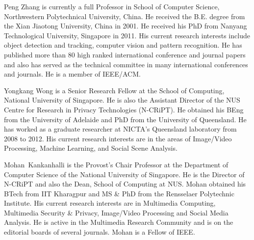 \documentclass[journal]{IEEEtran}
\begin{document}
\begin{IEEEbiography}{Peng Zhang}
	is currently a full Professor in School of Computer Science, Northwestern Polytechnical University, China. He received the B.E. degree from the Xian Jiaotong University, China in 2001. He received his PhD from Nanyang Technological University, Singapore in 2011. His current research interests include object detection and tracking, computer vision and pattern recognition. He has published more than 80 high ranked international conference and journal papers and also has served as the technical committee in many international conferences and journals. He is a member of IEEE/ACM.
\end{IEEEbiography}


\begin{IEEEbiography}{Yongkang Wong}
	is a Senior Research Fellow at the School of Computing, National University of Singapore.
	He is also the Assistant Director of the NUS Centre for Research in Privacy Technologies (N-CRiPT).
	He obtained his BEng from the University of Adelaide and PhD from the University of Queensland.
	He has worked as a graduate researcher at NICTA's Queensland laboratory from 2008 to 2012.
	His current research interests are in the areas of Image/Video Processing, Machine Learning, and Social Scene Analysis.
\end{IEEEbiography}


\begin{IEEEbiography}{Mohan~Kankanhalli}
	is the Provost's Chair Professor at the Department of Computer Science of the National University of Singapore.
	He is the Director of N-CRiPT and also the Dean, School of Computing at NUS.
	Mohan obtained his BTech from IIT Kharagpur and MS \& PhD from the Rensselaer Polytechnic Institute.
	His current research interests are in Multimedia Computing, Multimedia Security \& Privacy, Image/Video Processing and Social Media Analysis.
	He is active in the Multimedia Research Community and is on the editorial boards of several journals.
	Mohan is a Fellow of IEEE.
\end{IEEEbiography} 
\end{document}
